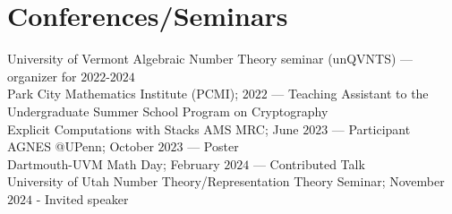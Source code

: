 \documentclass[letterpaper]{article}
\begin{document}
	\section*{Conferences/Seminars}
	\noindent University of Vermont Algebraic Number Theory seminar (unQVNTS) --- organizer for $2022$-$2024$\\
	\noindent Park City Mathematics Institute (PCMI); $2022$ --- Teaching Assistant to the Undergraduate Summer School Program on Cryptography\\
	\noindent Explicit Computations with Stacks AMS MRC; June $2023$ --- Participant\\
	\noindent AGNES @UPenn; October $2023$ --- Poster\\
	\noindent Dartmouth-UVM Math Day; February $2024$ --- Contributed Talk\\
	\noindent University of Utah Number Theory/Representation Theory Seminar; November $2024$ - Invited speaker
	
	
	
	
\end{document}
